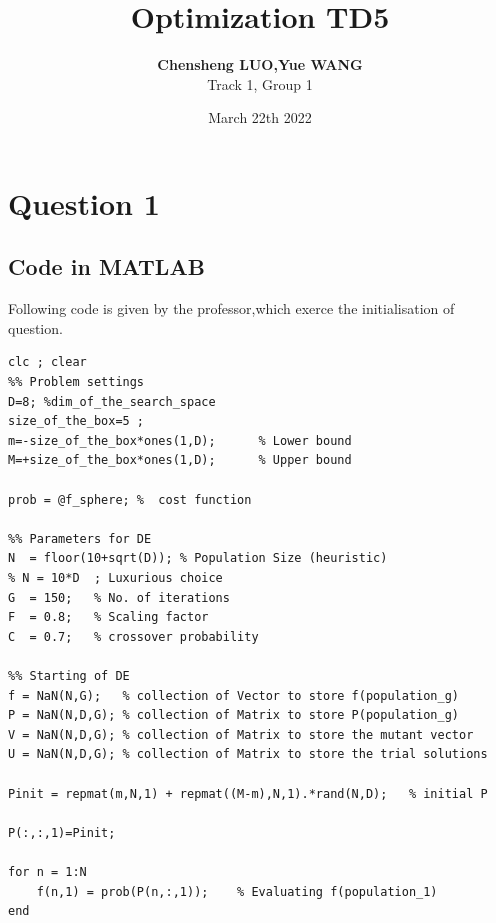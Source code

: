 \documentclass{CSArticle}[english]
\title{\textbf{Optimization TD5}}
\author{\textbf{Chensheng LUO,Yue WANG}\\Track 1, Group 1}
\date{March 22th 2022}
\begin{document}
\MakeSimpleTitle


\section{Question 1}
\label{Q1}
\subsection{Code in MATLAB}
Following code is given by the professor,which exerce the initialisation of question.
\begin{lstlisting}[style=MATLAB]
clc ; clear
%% Problem settings
D=8; %dim_of_the_search_space
size_of_the_box=5 ;
m=-size_of_the_box*ones(1,D);      % Lower bound
M=+size_of_the_box*ones(1,D);      % Upper bound

prob = @f_sphere; %  cost function

%% Parameters for DE
N  = floor(10+sqrt(D));	% Population Size (heuristic)
% N = 10*D  ; Luxurious choice
G  = 150;	% No. of iterations
F  = 0.8;	% Scaling factor
C  = 0.7;	% crossover probability

%% Starting of DE
f = NaN(N,G);   % collection of Vector to store f(population_g)
P = NaN(N,D,G); % collection of Matrix to store P(population_g)
V = NaN(N,D,G); % collection of Matrix to store the mutant vector 
U = NaN(N,D,G); % collection of Matrix to store the trial solutions 

Pinit = repmat(m,N,1) + repmat((M-m),N,1).*rand(N,D);	% initial P

P(:,:,1)=Pinit;

for n = 1:N
    f(n,1) = prob(P(n,:,1));	% Evaluating f(population_1)
end
\end{lstlisting}
\end{document}
